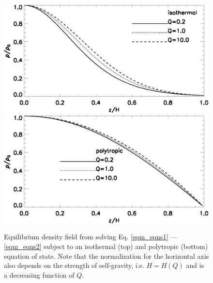 

\begin{figure}
  \includegraphics[width=\linewidth,clip=true,trim=0cm 1.5cm 0cm 0cm]{figures/compare_iso_density}
  \includegraphics[width=\linewidth,clip=true,trim=0cm 0cm 0cm 0.9cm]{figures/compare_poly_density}
  \caption{Equilibrium density field from solving Eq. \ref{eqm_eqns1}
    --- \ref{eqm_eqns2} subject to an isothermal (top) and polytropic
    (bottom) equation of state. Note that the normalization for the
    horizontal axis also depends on the strength of self-gravity,
    i.e. $H=H(Q)$ and is a decreasing function of $Q$. 
\label{eqm_den}}
\end{figure}

